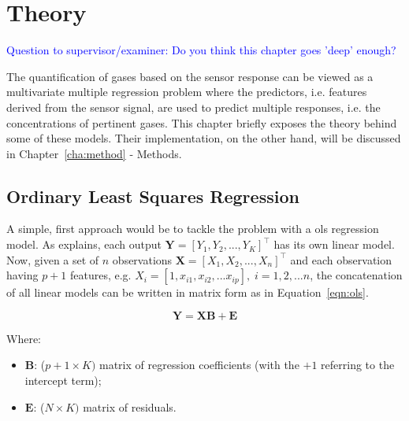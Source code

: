 
\chapter{Theory}
\label{cha:theory}

\textcolor{blue}{Question to supervisor/examiner: Do you think this chapter goes 'deep' enough?} 

The quantification of gases based on the sensor response can be viewed as a multivariate multiple regression problem where the predictors, i.e. features derived from the sensor signal, are used to predict multiple responses, i.e. the concentrations of pertinent gases. This chapter briefly exposes the theory behind some of these models. Their implementation, on the other hand, will be discussed in Chapter~\ref{cha:method} - Methods.

\section{Ordinary Least Squares Regression}
\label{sec:linreg}

A simple, first approach would be to tackle the problem with a \acrfull{ols} regression model. As \cite{friedman2001} explains, each output  $\mathbf{Y} = [Y_1, Y_2, ... , Y_K]^\intercal$ has its own linear model. Now, given a set of $n$ observations $\mathbf{X} = [X_1, X_2, ..., X_n]^\intercal$ and each observation having $p+1$ features, e.g. $X_i = [1,x_{i1}, x_{i2}, ... x_{ip}], \; i = 1,2,...n$, the concatenation of all linear models can be written in matrix form as in Equation~\ref{eqn:ols}.

\begin{equation}
	\label{eqn:ols}
	\mathbf{Y = XB +  E}
\end{equation}

Where:
\begin{itemize}
	\item $\mathbf{B}$: ($p+1 \times K)$ matrix of regression coefficients (with the $+1$ referring to the intercept term);
	\item $\mathbf{E}$: ($N \times K)$ matrix of residuals.
\end{itemize}

